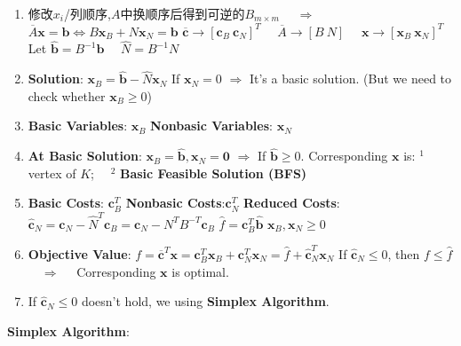 \documentclass[9pt]{article}
\begin{document}
\begin{enumerate}[itemsep=-2pt, topsep=-2pt]
    \item {\footnotesize 修改$x_i$/列顺序,$A$中换顺序后得到可逆的$B_{m\times m}$ \ \ $\Rightarrow$ \ \ $\overline{A}\mathbf{x}=\mathbf{b}\Leftrightarrow B\mathbf{x}_B+N\mathbf{x}_N=\mathbf{b}$ \quad $\overline{\mathbf{c}}\rightarrow[\mathbf{c}_B \ \mathbf{c}_N]^T$ \ \ $\overline{A}\rightarrow[B \ N]$ \ \ $\mathbf{x}\to[\mathbf{x}_B \ \mathbf{x}_N]^T$ \quad Let $\widehat{\mathbf{b}}=B^{-1}\mathbf{b}$ \ \ $\widehat{N}=B^{-1}N$}
    \item \textbf{Solution}: $\mathbf{x}_B=\widehat{\mathbf{b}}-\widehat{N}\mathbf{x}_N$ \quad \quad If $\mathbf{x}_N=0$ $\Rightarrow$ It's a basic solution. {\scriptsize (But we need to check whether $\mathbf{x}_B\geq0$)} \quad {}
    \item \textbf{Basic Variables}: $\mathbf{x}_B$ \quad \textbf{Nonbasic Variables}: $\mathbf{x}_N$
    \item \textbf{At Basic Solution}: $\mathbf{x}_B=\widehat{\mathbf{b}},\mathbf{x}_N=\mathbf{0}$ \quad $\Rightarrow$ \quad If $\widehat{\mathbf{b}}\geq0$. Corresponding $\mathbf{x}$ is: $^1$ vertex of $K$; \ \ $^2$ \textbf{Basic Feasible Solution (BFS)}
    \item \textbf{Basic Costs}: $\mathbf{c}^T_B$ \quad \textbf{Nonbasic Costs}:$\mathbf{c}^T_N$ \quad \textbf{Reduced Costs}: $\widehat{\mathbf{c}}_N=\mathbf{c}_N -\widehat{N}^T\mathbf{c}_B=\mathbf{c}_N-N^TB^{-T}\mathbf{c}_B$ \quad $\widehat{f}=\mathbf{c}_B^T\widehat{\mathbf{b}}$ \quad \quad $\mathbf{x}_B,\mathbf{x}_N\geq0$
    \item \textbf{Objective Value}: $f=\overline{\mathbf{c}}^T\mathbf{x}=\mathbf{c}^T_B\mathbf{x}_B+\mathbf{c}^T_N\mathbf{x}_N=\widehat{f}+\widehat{\mathbf{c}}_N^T\mathbf{x}_N$ \quad \quad If $\widehat{\mathbf{c}}_N\leq0$, then $f\leq\widehat{f}$ \ \ $\Rightarrow$ \ \ Corresponding $\mathbf{x}$ is optimal.
    \item If $\widehat{\mathbf{c}}_N\leq0$ doesn't hold, we using \textbf{Simplex Algorithm}.
\end{enumerate}

\textbf{Simplex Algorithm}:
\end{document}

